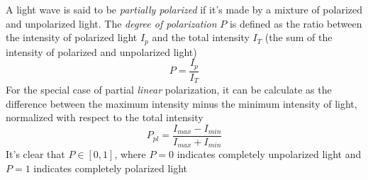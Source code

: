 \documentclass[../electromagnetism.tex]{subfiles}
\begin{document}
\begin{dfn}
	A light wave is said to be \textit{partially polarized} if it's made by a mixture of polarized and unpolarized light. The \textit{degree of polarization} $P$ is defined as the ratio between the intensity of polarized light $I_p$ and the total intensity $I_T$ (the sum of the intensity of polarized and unpolarized light)
	\begin{equation*}
		P=\frac{I_p}{I_T}
	\end{equation*}
	For the special case of partial \emph{linear} polarization, it can be calculate as the difference between the maximum intensity minus the minimum intensity of light, normalized with respect to the total intensity
	\begin{equation*}
		P_{pl}=\frac{I_{max}-I_{min}}{I_{max}+I_{min}}
	\end{equation*}
	It's clear that $P\in[0,1]$, where $P=0$ indicates completely unpolarized light and $P=1$ indicates completely polarized light
\end{dfn}
\end{document}
